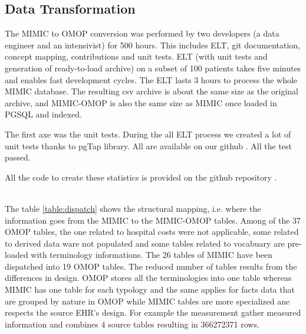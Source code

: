 %
% 
\subsection{Data Transformation}

%
%

The MIMIC to OMOP conversion was performed by two developers (a data engineer
and an intensivist) for 500 hours. This includes ELT, git documentation,
concept mapping, contributions and unit tests. ELT (with unit tests and
generation of ready-to-load archive) on a subset of 100 patients takes five
minutes and enables fast development cycles. The ELT lasts 3 hours to process
the whole MIMIC database. The resulting csv archive is about the same size as
the original archive, and MIMIC-OMOP is also the same size as MIMIC once loaded
in PGSQL and indexed.

The first axe was the unit tests. During the all ELT process we created a lot 
of unit tests thanks to pgTap library. 
All are available on our github \cite{mimic-omop-website}. All the test passed.

All the code to create these statistics is provided on the github repository 
\cite{mimic-omop-website}.

~
\\

%
%

The table \ref{table:dispatch} shows the structural mapping, i.e. where the
information goes from the MIMIC to the MIMIC-OMOP tables. Among of the 37 OMOP
tables, the one related to hospital costs were not applicable, some related to
derived data ware not populated and some tables related to vocabuary are
pre-loaded with terminology informations. The 26 tables of MIMIC have been
dispatched into 19 OMOP tables. The reduced number of tables results from the
differences in design. OMOP stores all the terminologies into one table whereas
MIMIC has one table for each typology and the same applies for facts data that
are grouped by nature in OMOP while MIMIC tables are more specialized ane
respects the source EHR's design. For example the measurement gather measured
information and combines 4 source tables resulting in 366272371 rows.

